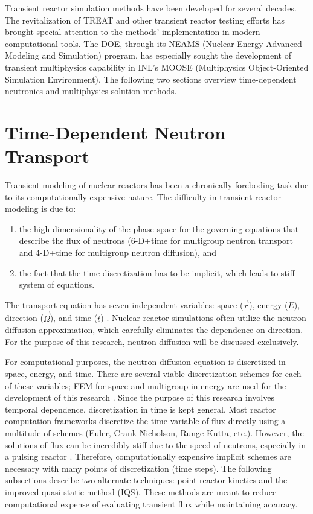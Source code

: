 Transient reactor simulation methods have been developed for several decades. The revitalization of TREAT and other transient reactor testing efforts has brought special attention to the methods' implementation in modern computational tools.  The DOE, through its NEAMS (Nuclear Energy Advanced Modeling and Simulation) program, has especially sought the development of transient multiphysics capability in INL's MOOSE (Multiphysics Object-Oriented Simulation Environment).  The following two sections overview time-dependent neutronics and multiphysics solution methods. 

\section{Time-Dependent Neutron Transport}

Transient modeling of nuclear reactors has been a chronically foreboding task due to its computationally expensive nature. The difficulty in transient reactor modeling is due to:
\begin{enumerate}
\item
the high-dimensionality of the phase-space for the governing equations that describe the flux of neutrons (6-D+time for multigroup neutron transport and 4-D+time for multigroup neutron diffusion), and 
\item
the fact that the time discretization has to be implicit, which  leads to stiff system of equations.  
\end{enumerate}
The transport equation has seven independent variables: space ($\vec{r}$), energy ($E$), direction ($\vec{\Omega}$), and time ($t$) \cite{duderstadt1976nuclear}.  Nuclear reactor simulations often utilize the neutron diffusion approximation, which carefully eliminates the dependence on direction.  For the purpose of this research, neutron diffusion will be discussed exclusively.

For computational purposes, the neutron diffusion equation is discretized in space, energy, and time.  There are several viable discretization schemes for each of these variables; FEM for space and multigroup in energy are used for the development of this research \cite{zeinkiewicz2005finite, duderstadt1976nuclear}. Since the purpose of this research involves temporal dependence, discretization in time is kept general. Most reactor computation frameworks discretize the time variable of flux directly using a multitude of schemes (Euler, Crank-Nicholson, Runge-Kutta, etc.).  However, the solutions of flux can be incredibly stiff due to the speed of neutrons, especially in a pulsing reactor \cite{TWIGL_benchmark}. Therefore, computationally expensive implicit schemes are necessary with many points of discretization (time steps). The following subsections describe two alternate techniques: point reactor kinetics and the improved quasi-static method (IQS). These methods are meant to reduce computational expense of evaluating transient flux while maintaining accuracy.

